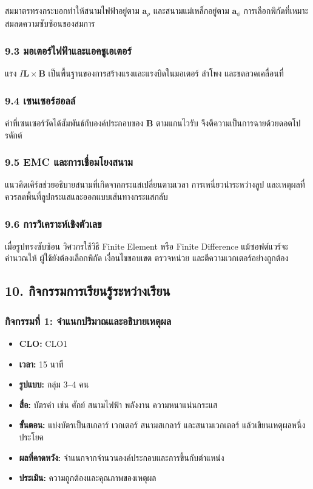 สมมาตรทรงกระบอกทำให้สนามไฟฟ้าอยู่ตาม \(\mathbf{a}_\rho\) และสนามแม่เหล็กอยู่ตาม \(\mathbf{a}_\phi\) การเลือกพิกัดที่เหมาะสมลดความซับซ้อนของสมการ

\subsubsection{9.3 มอเตอร์ไฟฟ้าและแอคชูเอเตอร์}

แรง \(I\mathbf{L}\times\mathbf{B}\) เป็นพื้นฐานของการสร้างแรงและแรงบิดในมอเตอร์ ลำโพง และขดลวดเคลื่อนที่

\subsubsection{9.4 เซนเซอร์ฮอลล์}

ค่าที่เซนเซอร์วัดได้สัมพันธ์กับองค์ประกอบของ \(\mathbf{B}\) ตามแกนไวรับ จึงตีความเป็นการฉายด้วยดอตโปรดักต์

\subsubsection{9.5 EMC และการเชื่อมโยงสนาม}

แนวคิดเคิร์ลช่วยอธิบายสนามที่เกิดจากกระแสเปลี่ยนตามเวลา การเหนี่ยวนำระหว่างลูป และเหตุผลที่ควรลดพื้นที่ลูปกระแสและออกแบบเส้นทางกระแสกลับ

\subsubsection{9.6 การวิเคราะห์เชิงตัวเลข}

เมื่อรูปทรงซับซ้อน วิศวกรใช้วิธี Finite Element หรือ Finite Difference แม้ซอฟต์แวร์จะคำนวณให้ ผู้ใช้ยังต้องเลือกพิกัด เงื่อนไขขอบเขต ตรวจหน่วย และตีความเวกเตอร์อย่างถูกต้อง

\subsection{10. กิจกรรมการเรียนรู้ระหว่างเรียน}

\subsubsection{กิจกรรมที่ 1: จำแนกปริมาณและอธิบายเหตุผล}

\begin{itemize}
\item \textbf{CLO:} CLO1
\item \textbf{เวลา:} 15 นาที
\item \textbf{รูปแบบ:} กลุ่ม 3--4 คน
\item \textbf{สื่อ:} บัตรคำ เช่น ศักย์ สนามไฟฟ้า พลังงาน ความหนาแน่นกระแส
\item \textbf{ขั้นตอน:} แบ่งบัตรเป็นสเกลาร์ เวกเตอร์ สนามสเกลาร์ และสนามเวกเตอร์ แล้วเขียนเหตุผลหนึ่งประโยค
\item \textbf{ผลที่คาดหวัง:} จำแนกจากจำนวนองค์ประกอบและการขึ้นกับตำแหน่ง
\item \textbf{ประเมิน:} ความถูกต้องและคุณภาพของเหตุผล
\end{itemize}

